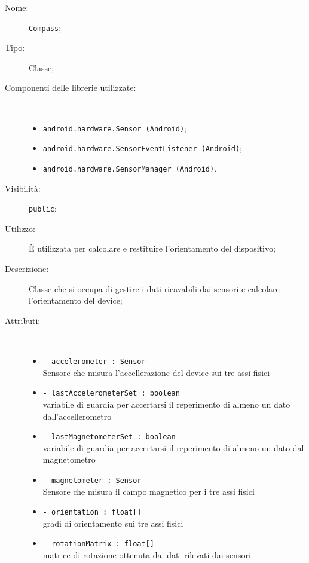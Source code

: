 \documentclass[../DefinizioneDiProdotto.tex]{subfiles}
\begin{document}
    \begin{description}
\item[Nome:] \texttt{Compass};
\item[Tipo:] Classe;
\item[Componenti delle librerie utilizzate:] \
\begin{itemize}
\item \texttt{android.hardware.Sensor (Android)};

\item \texttt{android.hardware.SensorEventListener (Android)};

\item \texttt{android.hardware.SensorManager (Android)}.

\end{itemize}
\item[Visibilità:] \texttt{public};
\item[Utilizzo:] È utilizzata per calcolare e restituire l'orientamento del dispositivo;
\item[Descrizione:] Classe che si occupa di gestire i dati ricavabili dai sensori e calcolare l'orientamento del device;
\item[Attributi:] \
\begin{itemize}
\item \texttt{- accelerometer : Sensor}\\
Sensore che misura l'accellerazione del device sui tre assi fisici

\item \texttt{- lastAccelerometerSet : boolean}\\
variabile di guardia per accertarsi il reperimento di almeno un dato dall'accellerometro

\item \texttt{- lastMagnetometerSet : boolean}\\
variabile di guardia per accertarsi il reperimento di almeno un dato dal magnetometro

\item \texttt{- magnetometer : Sensor}\\
Sensore che misura il campo magnetico per i tre assi fisici

\item \texttt{- orientation : float[]}\\
gradi di orientamento sui tre assi fisici

\item \texttt{- rotationMatrix : float[]}\\
matrice di rotazione ottenuta dai dati rilevati dai sensori


\end{itemize}
\end{description}
\end{document}
